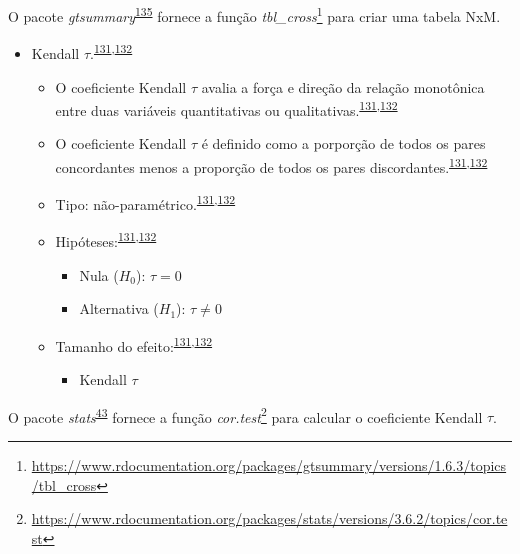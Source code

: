 \documentclass[
  a4paper,
]{book}
\providecommand{\tightlist}{%
  \setlength{\itemsep}{0pt}\setlength{\parskip}{0pt}}
\renewcommand{\href}[2]{#2\footnote{\url{#1}}}
\newenvironment{infobox}[1]
  {
  \begin{itemize}
  \renewcommand{\labelitemi}{
    \raisebox{-.7\height}[0pt][0pt]{
      {\setkeys{Gin}{width=3em,keepaspectratio}
        \texttt{[image: \#1]}}
    }
  }
  \setlength{\fboxsep}{1em}
  \begin{blackbox}
  \item
  }
  {
  \end{blackbox}
  \end{itemize}
  }
\begin{document}
\begin{infobox}{images/Rlogo}
O pacote \emph{gtsummary}\textsuperscript{\protect\hyperlink{ref-gtsummary}{135}} fornece a função \href{https://www.rdocumentation.org/packages/gtsummary/versions/1.6.3/topics/tbl_cross}{\emph{tbl\_cross}} para criar uma tabela NxM.

\end{infobox}

\begin{itemize}
\item
  Kendall \(\tau\).\textsuperscript{\protect\hyperlink{ref-khamis2008}{131},\protect\hyperlink{ref-allison2022}{132}}

  \begin{itemize}
  \item
    O coeficiente Kendall \(\tau\) avalia a força e direção da relação monotônica entre duas variáveis quantitativas ou qualitativas.\textsuperscript{\protect\hyperlink{ref-khamis2008}{131},\protect\hyperlink{ref-allison2022}{132}}
  \item
    O coeficiente Kendall \(\tau\) é definido como a porporção de todos os pares concordantes menos a proporção de todos os pares discordantes.\textsuperscript{\protect\hyperlink{ref-khamis2008}{131},\protect\hyperlink{ref-allison2022}{132}}
  \item
    Tipo: não-paramétrico.\textsuperscript{\protect\hyperlink{ref-khamis2008}{131},\protect\hyperlink{ref-allison2022}{132}}
  \item
    Hipóteses:\textsuperscript{\protect\hyperlink{ref-khamis2008}{131},\protect\hyperlink{ref-allison2022}{132}}

    \begin{itemize}
    \item
      Nula (\(H_{0}\)): \(\tau=0\)
    \item
      Alternativa (\(H_{1}\)): \(\tau≠0\)
    \end{itemize}
  \item
    Tamanho do efeito:\textsuperscript{\protect\hyperlink{ref-khamis2008}{131},\protect\hyperlink{ref-allison2022}{132}}

    \begin{itemize}
    \tightlist
    \item
      Kendall \(\tau\)
    \end{itemize}
  \end{itemize}
\end{itemize}

\begin{infobox}{images/Rlogo}
O pacote \emph{stats}\textsuperscript{\protect\hyperlink{ref-stats-2}{43}} fornece a função \href{https://www.rdocumentation.org/packages/stats/versions/3.6.2/topics/cor.test}{\emph{cor.test}} para calcular o coeficiente Kendall \(\tau\).

\end{infobox}
\end{document}
